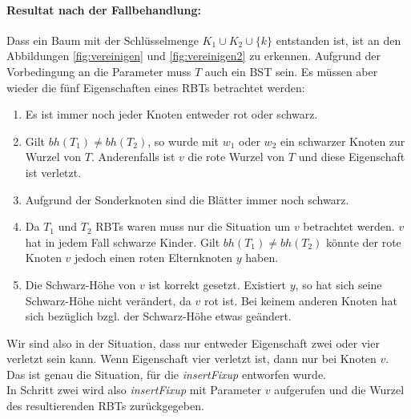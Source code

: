 \documentclass[a4paper,12pt]{article}
\begin{document}
\paragraph{Resultat nach der Fallbehandlung:}
Dass ein Baum mit der Schlüsselmenge  $K_1 \cup K_2 \cup \{k\} $ entstanden ist, ist an den Abbildungen \ref{fig:vereinigen} und \ref{fig:vereinigen2} zu erkennen. Aufgrund der Vorbedingung an die Parameter muss $T$ auch ein BST sein. Es müssen aber wieder die fünf Eigenschaften eines RBTs betrachtet werden:
\begin{enumerate}
	\item Es ist immer noch jeder Knoten entweder rot oder schwarz.
	\item Gilt $bh(T_1) \neq bh(T_2)$, so wurde mit $w_1$ oder $w_2$ ein schwarzer Knoten zur Wurzel von $T$. Anderenfalls ist $v$ die rote Wurzel von $T$ und diese Eigenschaft ist verletzt.   
	\item Aufgrund der Sonderknoten sind die Blätter immer noch schwarz.
	\item Da $T_1$ und $T_2$ RBTs waren muss nur die Situation um $v$ betrachtet werden. $v$ hat in jedem Fall schwarze Kinder. Gilt $bh(T_1) \neq bh(T_2)$ könnte der rote Knoten $v$ jedoch einen roten Elternknoten $y$ haben. 
	\item Die Schwarz-Höhe von $v$ ist korrekt gesetzt. Existiert $y$, so hat sich seine Schwarz-Höhe nicht verändert, da $v$ rot ist. Bei keinem anderen Knoten hat sich bezüglich bzgl. der Schwarz-Höhe etwas geändert. 
\end{enumerate} 
Wir sind also in der Situation, dass nur entweder Eigenschaft zwei oder vier verletzt sein kann. Wenn Eigenschaft vier verletzt ist, dann nur bei Knoten $v$. Das ist genau die Situation, für die \textit{insertFixup} entworfen wurde.\\
In Schritt zwei wird also \textit{insertFixup} mit Parameter $v$ aufgerufen und die Wurzel des resultierenden RBTs zurückgegeben. 
\end{document}
